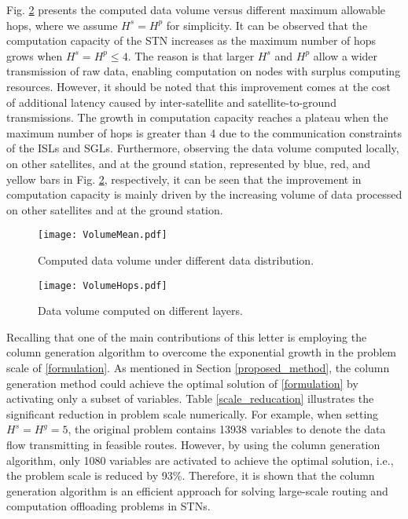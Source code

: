 \documentclass[journal,10pt]{IEEEtran}
\begin{document}
Fig. \ref{diff_hops} presents the computed data volume versus different maximum allowable hops, where we assume $H^s = H^p$ for simplicity. It can be observed that the computation capacity of the STN increases as the maximum number of hops grows when $H^s = H^p \leq 4$. The reason is that larger $H^s$ and $H^p$ allow a wider transmission of raw data, enabling computation on nodes with surplus computing resources. However, it should be noted that this improvement comes at the cost of additional latency caused by inter-satellite and satellite-to-ground transmissions. The growth in computation capacity reaches a plateau when the maximum number of hops is greater than 4 due to the communication constraints of the ISLs and SGLs. Furthermore, observing the data volume computed locally, on other satellites, and at the ground station, represented by blue, red, and yellow bars in Fig. \ref{diff_hops}, respectively, it can be seen that the improvement in computation capacity is mainly driven by the increasing volume of data processed on other satellites and at the ground station.

\begin{figure}[!t]
\centering
\texttt{[image: VolumeMean.pdf]}
\caption{Computed data volume under different data distribution.}
\label{diff_mean}
\vspace{-0.4cm}
\end{figure}

\begin{figure}[!t]
\centering
\texttt{[image: VolumeHops.pdf]}
\caption{Data volume computed on different layers.}
\label{diff_hops}
\end{figure}

Recalling that one of the main contributions of this letter is employing the column generation algorithm to overcome the exponential growth in the problem scale of \eqref{formulation}. As mentioned in Section \ref{proposed_method}, the column generation method could achieve the optimal solution of \eqref{formulation} by activating only a subset of variables. Table \ref{scale_reducation} illustrates the significant reduction in problem scale numerically. For example, when setting $H^s=H^g=5$, the original problem contains 13938 variables to denote the data flow transmitting in feasible routes. However, by using the column generation algorithm, only 1080 variables are activated to achieve the optimal solution, i.e., the problem scale is reduced by 93\%. Therefore, it is shown that the column generation algorithm is an efficient approach for solving large-scale routing and computation offloading problems in STNs.
\end{document}
